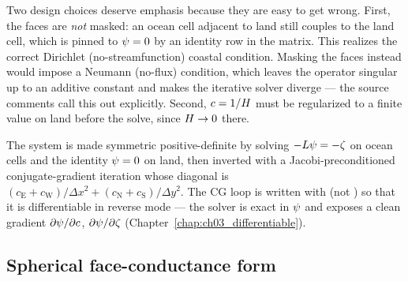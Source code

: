 Two design choices deserve emphasis because they are easy to get wrong. First, the faces are
\emph{not} masked: an ocean cell adjacent to land still couples to the land cell, which is
pinned to $\psi=0$ by an identity row in the matrix. This realizes the correct Dirichlet
(no-streamfunction) coastal condition. Masking the faces instead would impose a Neumann
(no-flux) condition, which leaves the operator singular up to an additive constant and makes
the iterative solver diverge --- the source comments call this out explicitly. Second, $c=1/H$
must be regularized to a finite value on land before the solve, since $H\to0$ there.

The system is made symmetric positive-definite by solving $-L\psi=-\zeta$ on ocean cells and
the identity $\psi=0$ on land, then inverted with a Jacobi-preconditioned conjugate-gradient
iteration whose diagonal is $(c_{\mathrm E}+c_{\mathrm W})/\Delta x^2+(c_{\mathrm N}+c_{\mathrm S})/\Delta y^2$.
The CG loop is written with  (not ) so that it is
differentiable in reverse mode --- the solver is exact in $\psi$ and exposes a clean gradient
$\partial\psi/\partial c$, $\partial\psi/\partial\zeta$
(Chapter~\ref{chap:ch03_differentiable}).

\subsection*{Spherical face-conductance form}

